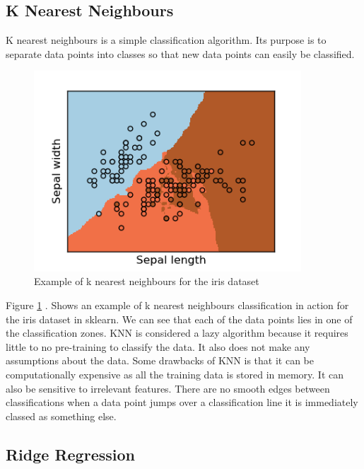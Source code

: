 \subsection{K Nearest Neighbours}

K nearest neighbours is a simple classification algorithm. Its purpose is to separate data points into classes so that new data points can easily be classified.
\begin{figure}[H]
  \centering
  \includegraphics[scale=0.5,width=100mm]{./images/k-nearest-neighbours-example.png}
  \caption{Example of k nearest neighbours for the iris dataset}
  \label{fig:k-nearest-neighbours-example}
\end{figure}
Figure \ref{fig:k-nearest-neighbours-example} \cite{kNearestNeighboursExample}. Shows an example of k nearest neighbours classification in action for the iris dataset in sklearn. We can see that each of the data points lies in one of the classification zones. KNN is considered a lazy algorithm because it requires little to no pre-training to classify the data. It also does not make any assumptions about the data. Some drawbacks of KNN is that it can be computationally expensive as all the training data is stored in memory. It can also be sensitive to irrelevant features. There are no smooth edges between classifications when a data point jumps over a classification line it is immediately classed as something else.

\subsection{Ridge Regression}

